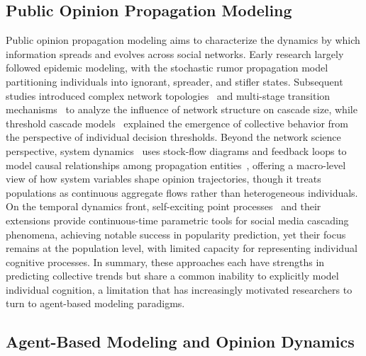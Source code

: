 \documentclass[a4paper,fleqn]{cas-dc}
\begin{document}
\subsection{Public Opinion Propagation Modeling}
Public opinion propagation modeling aims to characterize the dynamics by which information spreads and evolves across social networks. Early research largely followed epidemic modeling, with the stochastic rumor propagation model~\citep{daley_stochastic_1965} partitioning individuals into ignorant, spreader, and stifler states. Subsequent studies introduced complex network topologies~\citep{watts_strogatz_1998,barabasi_albert_1999} and multi-stage transition mechanisms~\citep{jiang_weibo_spnr_2020} to analyze the influence of network structure on cascade size, while threshold cascade models~\citep{granovetter_threshold_1978,watts_cascades_2002} explained the emergence of collective behavior from the perspective of individual decision thresholds. Beyond the network science perspective, system dynamics~\citep{forrester_industrial_1961,sterman_business_2000} uses stock-flow diagrams and feedback loops to model causal relationships among propagation entities~\citep{gao_sd_public_opinion_2019,liu_evolution_2024}, offering a macro-level view of how system variables shape opinion trajectories, though it treats populations as continuous aggregate flows rather than heterogeneous individuals. On the temporal dynamics front, self-exciting point processes~\citep{hawkes_spectra_1971} and their extensions provide continuous-time parametric tools for social media cascading phenomena, achieving notable success in popularity prediction, yet their focus remains at the population level, with limited capacity for representing individual cognitive processes. In summary, these approaches each have strengths in predicting collective trends but share a common inability to explicitly model individual cognition, a limitation that has increasingly motivated researchers to turn to agent-based modeling paradigms.

\subsection{Agent-Based Modeling and Opinion Dynamics}
\end{document}
